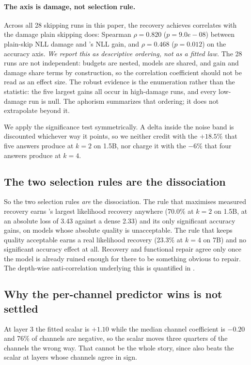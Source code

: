 \paragraph{The axis is damage, not selection rule.} Across all 28 skipping runs in this
paper, the recovery \mname achieves correlates with the damage plain skipping does: Spearman
$\rho = 0.820$ ($p = 9.0e-08$) between plain-skip NLL damage and \mname's NLL
gain, and $\rho = 0.468$ ($p = 0.012$) on the accuracy axis. \emph{We report this
as descriptive ordering, not as a fitted law.} The 28 runs are not independent: budgets
are nested, models are shared, and gain and damage share terms by construction, so the
correlation coefficient should not be read as an effect size. The robust evidence is the
enumeration rather than the statistic: the five largest gains all occur in high-damage runs,
and every low-damage run is null. The aphorism summarizes that ordering; it does not
extrapolate beyond it.

We apply the significance test symmetrically. A delta inside the noise band is discounted
whichever way it points, so we neither credit \mname with the $+18.5\%$ that five answers
produce at
$k=2$ on 1.5B, nor charge it with the $-6\%$ that four answers produce at $k=4$.

\subsection{The two selection rules are the dissociation}
\label{sec:app-tworules}

So the two selection rules \emph{are} the dissociation. The rule that maximises measured
recovery earns \mname's largest likelihood recovery anywhere (70.0\% at $k=2$ on
1.5B, at an absolute loss of 3.43 against a dense 2.33) and its only
significant accuracy gains, on models whose absolute quality is unacceptable. The rule
that keeps quality acceptable earns a real likelihood recovery (23.3\% at $k=4$ on
7B) and no significant accuracy effect at all. Recovery and functional repair agree only once the
model is already ruined enough for there to be something obvious to repair. The
depth-wise anti-correlation underlying this is quantified in .

\subsection{Why the per-channel predictor wins is not settled}
At layer 3 the fitted scalar is $+1.10$ while the median channel coefficient is
$-0.20$ and 76\% of channels are negative, so the scalar moves three quarters of
the channels the wrong way. That cannot be the whole story, since \mname also beats the
scalar at layers whose channels agree in sign.

